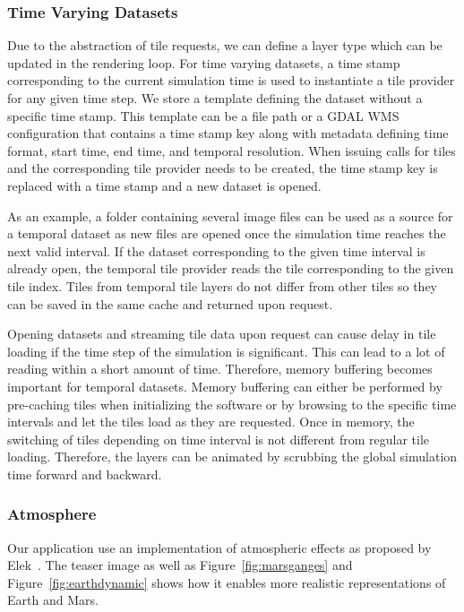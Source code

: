 \documentclass[journal]{vgtc}                %
\newcommand{\fig}[1]{Figure~\ref{fig:#1}}
\begin{document}
\fi


\subsubsection{Time Varying Datasets}
Due to the abstraction of tile requests, we can define a layer type which can be updated in the rendering loop. For time varying datasets, a time stamp corresponding to the current simulation time is used to instantiate a tile provider for any given time step.
We store a template defining the dataset without a specific time stamp. This template can be a file path or a GDAL WMS configuration that contains a time stamp key along with metadata defining time format, start time, end time, and temporal resolution. When issuing calls for tiles and the corresponding tile provider needs to be created, the time stamp key is replaced with a time stamp and a new dataset is opened.

As an example, a folder containing several image files can be used as a source for a temporal dataset as new files are opened once the simulation time reaches the next valid interval. If the dataset corresponding to the given time interval is already open, the temporal tile provider reads the tile corresponding to the given tile index.
Tiles from temporal tile layers do not differ from other tiles so they can be saved in the same cache and returned upon request.

Opening datasets and streaming tile data upon request can cause delay in tile loading if the time step of the simulation is significant. This can lead to a lot of reading within a short amount of time. Therefore, memory buffering becomes important for temporal datasets. Memory buffering can either be performed by pre-caching tiles when initializing the software or by browsing to the specific time intervals and let the tiles load as they are requested. Once in memory, the switching of tiles depending on time interval is not different from regular tile loading. Therefore, the layers can be animated by scrubbing the global simulation time forward and backward.

\subsubsection{Atmosphere}
Our application use an implementation of atmospheric effects as proposed by Elek~\cite{elek2009rendering}. The teaser image as well as \fig{marsganges} and \fig{earthdynamic} shows how it enables more realistic representations of Earth and Mars.
\end{document}
